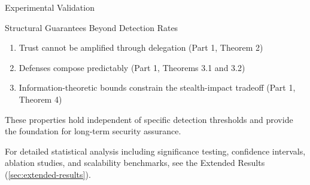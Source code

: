 \documentclass[
  ignorenonframetext,
]{beamer}
\begin{document}
\begin{frame}[fragile]{Experimental Validation}
\begin{block}{Structural Guarantees Beyond Detection Rates}
\begin{enumerate}
\item Trust cannot be amplified through delegation (Part 1, Theorem 2)
\item Defenses compose predictably (Part 1, Theorems 3.1 and 3.2)
\item Information-theoretic bounds constrain the stealth-impact tradeoff (Part 1, Theorem 4)
\end{enumerate}

These properties hold independent of specific detection thresholds and
provide the foundation for long-term security assurance.

For detailed statistical analysis including significance testing,
confidence intervals, ablation studies, and scalability benchmarks, see
the Extended Results (\cref{sec:extended-results}).
\end{block}
\end{frame}
\end{document}
